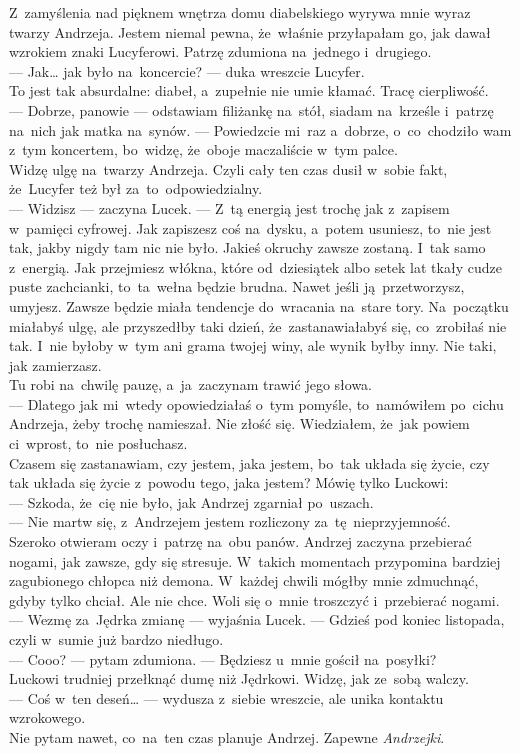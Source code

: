 \documentclass[9pt, a5paper]{memoir}
\begin{document}
Z~zamyślenia nad pięknem wnętrza domu diabelskiego wyrywa mnie wyraz twarzy Andrzeja. Jestem niemal pewna, że~właśnie przyłapałam go, jak dawał wzrokiem znaki Lucyferowi. Patrzę zdumiona na~jednego i~drugiego.\\
--- Jak\dots{} jak było na~koncercie? --- duka wreszcie Lucyfer.\\
To jest tak absurdalne: diabeł, a~zupełnie nie umie kłamać. Tracę cierpliwość.\\
--- Dobrze, panowie --- odstawiam filiżankę na~stół, siadam na~krześle i~patrzę na~nich jak matka na~synów. --- Powiedzcie mi~raz a~dobrze, o~co~chodziło wam z~tym koncertem, bo~widzę, że~oboje maczaliście w~tym palce.\\
Widzę ulgę na~twarzy Andrzeja. Czyli cały ten czas dusił w~sobie fakt, że~Lucyfer też był za~to~odpowiedzialny.\\
--- Widzisz --- zaczyna Lucek. --- Z~tą energią jest trochę jak z~zapisem w~pamięci cyfrowej. Jak zapiszesz coś na~dysku, a~potem usuniesz, to~nie jest tak, jakby nigdy tam nic nie było. Jakieś okruchy zawsze zostaną. I~tak samo z~energią. Jak przejmiesz włókna, które od~dziesiątek albo setek lat tkały cudze puste zachcianki, to~ta~wełna będzie brudna. Nawet jeśli ją~przetworzysz, umyjesz. Zawsze będzie miała tendencje do~wracania na~stare tory. Na~początku miałabyś ulgę, ale przyszedłby taki dzień, że~zastanawiałabyś się, co~zrobiłaś nie tak. I~nie byłoby w~tym ani grama twojej winy, ale wynik byłby inny. Nie taki, jak zamierzasz.\\
Tu robi na~chwilę pauzę, a~ja~zaczynam trawić jego słowa.\\
--- Dlatego jak mi~wtedy opowiedziałaś o~tym pomyśle, to~namówiłem po~cichu Andrzeja, żeby trochę namieszał. Nie złość się. Wiedziałem, że~jak powiem ci~wprost, to~nie posłuchasz.\\
Czasem się zastanawiam, czy jestem, jaka jestem, bo~tak układa się życie, czy tak układa się życie z~powodu tego, jaka jestem? Mówię tylko Luckowi:\\
--- Szkoda, że~cię nie było, jak Andrzej zgarniał po~uszach.\\
--- Nie martw się, z~Andrzejem jestem rozliczony za~tę~nieprzyjemność.\\
Szeroko otwieram oczy i~patrzę na~obu panów. Andrzej zaczyna przebierać nogami, jak zawsze, gdy się stresuje. W~takich momentach przypomina bardziej zagubionego chłopca niż demona. W~każdej chwili mógłby mnie zdmuchnąć, gdyby tylko chciał. Ale nie chce. Woli się o~mnie troszczyć i~przebierać nogami.\\
--- Wezmę za~Jędrka zmianę --- wyjaśnia Lucek. --- Gdzieś pod koniec listopada, czyli w~sumie już bardzo niedługo.\\
--- Cooo? --- pytam zdumiona. --- Będziesz u~mnie gościł na~posyłki?\\
Luckowi trudniej przełknąć dumę niż Jędrkowi. Widzę, jak ze~sobą walczy.\\
--- Coś w~ten deseń\dots{} --- wydusza z~siebie wreszcie, ale unika kontaktu wzrokowego.\\
Nie pytam nawet, co~na~ten czas planuje Andrzej. Zapewne \textit{Andrzejki}.
\end{document}
